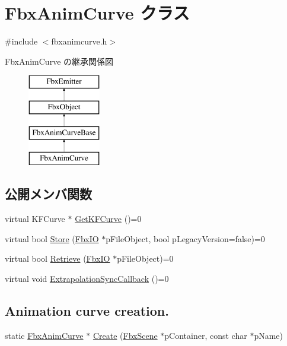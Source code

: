 \hypertarget{class_fbx_anim_curve}{}\section{Fbx\+Anim\+Curve クラス}
\label{class_fbx_anim_curve}


{\ttfamily \#include $<$fbxanimcurve.\+h$>$}

Fbx\+Anim\+Curve の継承関係図\begin{figure}[H]
\begin{center}
\leavevmode
\includegraphics[height=4.000000cm]{class_fbx_anim_curve}
\end{center}
\end{figure}
\subsection*{公開メンバ関数}
\begin{DoxyCompactItemize}
\item 
virtual K\+F\+Curve $\ast$ \hyperlink{class_fbx_anim_curve_a7c7cbe48da39fa57af9f32acc68a0ba5}{Get\+K\+F\+Curve} ()=0
\item 
virtual bool \hyperlink{class_fbx_anim_curve_a0ef3229e43aaca33ab50161235541060}{Store} (\hyperlink{class_fbx_i_o}{Fbx\+IO} $\ast$p\+File\+Object, bool p\+Legacy\+Version=false)=0
\item 
virtual bool \hyperlink{class_fbx_anim_curve_a17087752d3a28d373b2aaa66d1755f62}{Retrieve} (\hyperlink{class_fbx_i_o}{Fbx\+IO} $\ast$p\+File\+Object)=0
\item 
virtual void \hyperlink{class_fbx_anim_curve_a8982eaf744608ac38457fd6f87990044}{Extrapolation\+Sync\+Callback} ()=0
\end{DoxyCompactItemize}
\subsection*{Animation curve creation.}
\begin{DoxyCompactItemize}
\item 
static \hyperlink{class_fbx_anim_curve}{Fbx\+Anim\+Curve} $\ast$ \hyperlink{class_fbx_anim_curve_ab0faf2c8c4a3d0fa8535da4a3eacb74a}{Create} (\hyperlink{class_fbx_scene}{Fbx\+Scene} $\ast$p\+Container, const char $\ast$p\+Name)
\end{DoxyCompactItemize}
